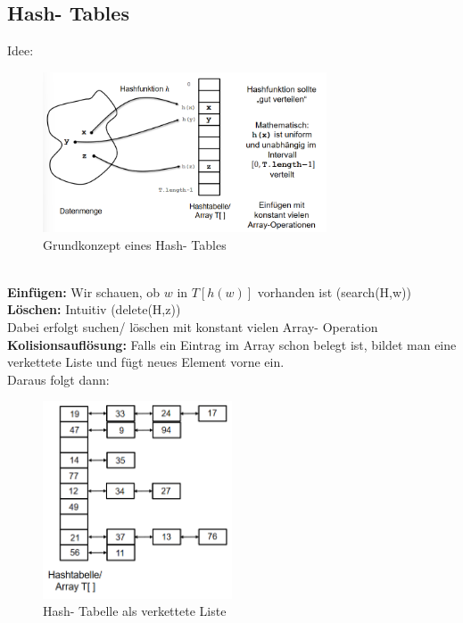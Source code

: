 \documentclass{article}
\begin{document}
        \subsection{Hash- Tables}
            Idee:\\
            \begin{figure}[ht]
                \centering
                \includegraphics[width=0.75\textwidth]{Bilder/HashTIdee.png}
                \caption{Grundkonzept eines Hash- Tables}
                \label{fig:HashTIdee}
            \end{figure}\\
            \textbf{Einfügen:} Wir schauen, ob $w$ in $T[h(w)]$ vorhanden ist (search(H,w))\\
            \textbf{Löschen:} Intuitiv (delete(H,z))\\
            Dabei erfolgt suchen/ löschen mit konstant vielen Array- Operation\\
            \textbf{Kolisionsauflösung:} Falls ein Eintrag im Array schon belegt ist, bildet man eine verkettete Liste und fügt neues Element vorne ein.\\
            Daraus folgt dann:
            \begin{figure}[ht]
                \centering
                \includegraphics[width=0.5\textwidth]{Bilder/HashTVL.png}
                \caption{Hash- Tabelle als verkettete Liste}
                \label{fig:HashTVL}
            \end{figure}
\end{document}
